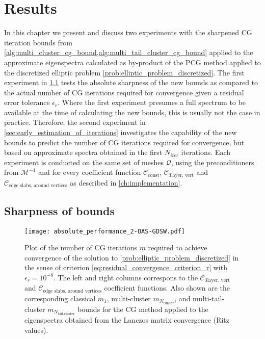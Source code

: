 \chapter{Results}\label{ch:results}
In this chapter we present and discuss two experiments with the sharpened CG iteration bounds from \cref{alg:multi_cluster_cg_bound,alg:multi_tail_cluster_cg_bound} applied to the approximate eigenspectra calculated as by-product of the PCG method applied to the discretized elliptic problem \cref{prob:elliptic_problem_discretized}. The first experiment in \cref{sec:sharpness_of_bounds} tests the absolute sharpness of the new bounds as compared to the actual number of CG iterations required for convergence given a residual error tolerance $\epsilon_r$. Where the first experiment presumes a full spectrum to be available at the time of calculating the new bounds, this is usually not the case in practice. Therefore, the second experiment in \cref{sec:early_estimation_of_iterations} investigates the capability of the new bounds to predict the number of CG iterations required for convergence, but based on approximate spectra obtained in the first $N_{iter}$ iterations. Each experiment is conducted on the same set of meshes $\mathcal{Q}$, using the preconditioners from $\mathcal{M}^{-1}$ and for every coefficient function $\mathcal{C}_{\text{const}}$, $\mathcal{C}_{\text{3layer, vert}}$ and $\mathcal{C}_{\text{edge slabs, around vertices}}$ as described in \cref{ch:implementation}.

\section{Sharpness of bounds}\label{sec:sharpness_of_bounds}
\begin{figure}[H]
    \centering
    \texttt{[image: absolute\_performance\_2-OAS-GDSW.pdf]}
    \caption{Plot of the number of CG iterations $m$ required to achieve convergence of the solution to \cref{prob:elliptic_problem_discretized} in the sense of criterion \cref{eq:residual_convergence_criterion_r} with $\epsilon_r=10^{-8}$. The left and right columns correspons to the $\mathcal{C}_{\text{3layer, vert}}$ and $\mathcal{C}_{\text{edge slabs, around vertices}}$ coefficient functions. Also shown are the corresponding classical $m_1$, multi-cluster $m_{N_{\text{cluster}}}$, and multi-tail-cluster $m_{N_{\text{tail-cluster}}}$ bounds for the CG method applied to the eigenspectra obtained from the Lanczos matrix convergence (Ritz values).}
    \label{fig:cg_bounds_gdsw}
\end{figure}

